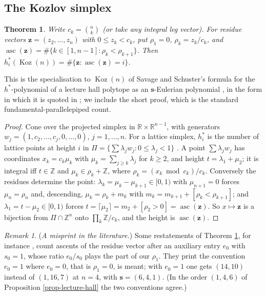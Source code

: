 \documentclass[11pt, a4paper, abstract=yes]{scrartcl}
\theoremstyle{definition}
\theoremstyle{remark}
\newtheorem{remark}[definition]{Remark}
\theoremstyle{plain}
\newtheorem{theorem}[definition]{Theorem}
\newcommand{\vek}[1]{\boldsymbol{#1}}
\theoremstyle{remark}
\theoremstyle{plain}
\newcommand{\Koz}{\operatorname{Koz}}
\newcommand{\asc}{\operatorname{asc}}
\newcommand{\leannone}{\tikz[baseline=-0.6ex]\draw[leannone,line width=0.6pt] (0,0) circle (0.55ex);}
\newcommand{\leanmark}[1]{\leavevmode{\reversemarginpar\marginnote{\raggedleft#1}}}
\let\autocite\cite
\begin{document}
\subsection{The Kozlov simplex}
\label{sec:orgb616b5a}

\begin{theorem}
\leanmark{\leannone}Write \(c_k=\binom nk\) (or take any integral leg vector). For residue vectors \(\vek z=(z_2,\dots,z_n)\) with
\(0\le z_k<c_k\), put \(\rho_1=0\), \(\rho_k=z_k/c_k\), and
\(\asc(\vek z)=\#\lbrace k\in[1,n-1]:\rho_k<\rho_{k+1}\rbrace\). Then
\(h^*_i(\Koz(n))=\#\lbrace\vek z:\asc(\vek z)=i\rbrace\).
\label{thm-hstar}
\end{theorem}

This is the specialisation to \(\Koz(n)\) of Savage and Schuster's formula for the \(h^*\)-polynomial
of a lecture hall polytope as an \(\vek s\)-Eulerian polynomial \autocite{SavageSchuster2012}, in the
form in which it is quoted in \autocite{HibiOlsenTsuchiya2018,SavageVisontai2015}; we include the
short proof, which is the standard fundamental-parallelepiped count.

\begin{proof}
Cone over the projected simplex in \(\mathbb R\times\mathbb R^{n-1}\), with generators
\(w_j=(1,c_2,\dots,c_j,0,\dots,0)\), \(j=1,\dots,n\). For a lattice simplex, \(h^*_i\) is the number
of lattice points at height \(i\) in \(\Pi=\lbrace\sum\lambda_jw_j:0\le\lambda_j<1\rbrace\)
\autocite[Chapter 3]{BeckRobins2015}. A point \(\sum\lambda_jw_j\) has coordinates \(x_k=c_k\mu_k\) with
\(\mu_k=\sum_{j\ge k}\lambda_j\) for \(k\ge2\), and height \(t=\lambda_1+\mu_2\); it is integral iff
\(t\in\mathbb Z\) and \(\mu_k\in\rho_k+\mathbb Z\), where \(\rho_k=(x_k\bmod c_k)/c_k\). Conversely the
residues determine the point: \(\lambda_k=\mu_k-\mu_{k+1}\in[0,1)\) with \(\mu_{n+1}=0\) forces
\(\mu_n=\rho_n\) and, descending, \(\mu_k=\rho_k+m_k\) with
\(m_k=m_{k+1}+[\rho_k<\rho_{k+1}]\); and \(\lambda_1=t-\mu_2\in[0,1)\) forces
\(t=\lceil\mu_2\rceil=m_2+[\rho_2>0]=\asc(\vek z)\). So \(x\mapsto\vek z\) is a bijection from
\(\Pi\cap\mathbb Z^n\) onto \(\prod_k\mathbb Z/c_k\), and the height is \(\asc(\vek z)\).
\end{proof}

\begin{remark}
(\emph{A misprint in the literature.}) Some restatements of Theorem \ref{thm-hstar}, for instance
\autocite[Lemma 1.1]{HibiOlsenTsuchiya2018}, count ascents of the residue vector after an auxiliary
entry \(e_0\) with \(s_0=1\), whose ratio \(e_0/s_0\) plays the part of our \(\rho_1\). They print the
convention \(e_0=1\) where \(e_0=0\), that is \(\rho_1=0\), is meant; with \(e_0=1\) one gets
\((14,10)\) instead of \((1,16,7)\) at \(n=4\), with \(\vek s=(6,4,1)\). (In the order \((1,4,6)\) of
Proposition \ref{prop-lecture-hall} the two conventions agree.)
\label{rem-hstar-misprint}
\end{remark}
\end{document}
